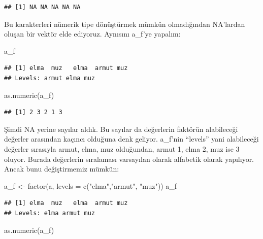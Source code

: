 \documentclass[
]{book}
\newenvironment{Shaded}{\begin{snugshade}}{\end{snugshade}}
\newcommand{\AttributeTok}[1]{\textcolor[rgb]{0.77,0.63,0.00}{#1}}
\newcommand{\FunctionTok}[1]{\textcolor[rgb]{0.00,0.00,0.00}{#1}}
\newcommand{\NormalTok}[1]{#1}
\newcommand{\OtherTok}[1]{\textcolor[rgb]{0.56,0.35,0.01}{#1}}
\newcommand{\StringTok}[1]{\textcolor[rgb]{0.31,0.60,0.02}{#1}}
\begin{document}
\begin{verbatim}
## [1] NA NA NA NA NA
\end{verbatim}

Bu karakterleri nümerik tipe dönüştürmek mümkün olmadığından NA'lardan oluşan bir vektör elde ediyoruz. Aynısını a\_f'ye yapalım:

\begin{Shaded}
\begin{Highlighting}[]
\NormalTok{a\_f}
\end{Highlighting}
\end{Shaded}

\begin{verbatim}
## [1] elma  muz   elma  armut muz  
## Levels: armut elma muz
\end{verbatim}

\begin{Shaded}
\begin{Highlighting}[]
\FunctionTok{as.numeric}\NormalTok{(a\_f)}
\end{Highlighting}
\end{Shaded}

\begin{verbatim}
## [1] 2 3 2 1 3
\end{verbatim}

Şimdi NA yerine sayılar aldık. Bu sayılar da değerlerin faktörün alabileceği değerler arasından kaçıncı olduğuna denk geliyor. a\_f'nin ``levels'' yani alabileceği değerler sırasıyla armut, elma, muz olduğundan, armut 1, elma 2, muz ise 3 oluyor. Burada değerlerin sıralaması varsayılan olarak alfabetik olarak yapılıyor. Ancak bunu değiştirmemiz mümkün:

\begin{Shaded}
\begin{Highlighting}[]
\NormalTok{a\_f }\OtherTok{\textless{}{-}} \FunctionTok{factor}\NormalTok{(a, }\AttributeTok{levels =} \FunctionTok{c}\NormalTok{(}\StringTok{"elma"}\NormalTok{,}\StringTok{"armut"}\NormalTok{, }\StringTok{"muz"}\NormalTok{))}
\NormalTok{a\_f}
\end{Highlighting}
\end{Shaded}

\begin{verbatim}
## [1] elma  muz   elma  armut muz  
## Levels: elma armut muz
\end{verbatim}

\begin{Shaded}
\begin{Highlighting}[]
\FunctionTok{as.numeric}\NormalTok{(a\_f)}
\end{Highlighting}
\end{Shaded}
\end{document}
